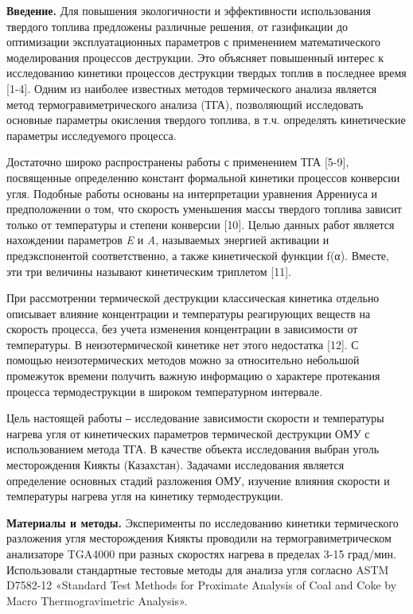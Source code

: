 \begin{multicols}{2}
{\bfseries Введение.} Для повышения экологичности и эффективности
использования твердого топлива предложены различные решения, от
газификации до оптимизации эксплуатационных параметров с применением
математического моделирования процессов деструкции. Это объясняет
повышенный интерес к исследованию кинетики процессов деструкции твердых
топлив в последнее время {[}1-4{]}. Одним из наиболее известных методов
термического анализа является метод термогравиметрического анализа
(ТГА), позволяющий исследовать основные параметры окисления твердого
топлива, в т.ч. определять кинетические параметры исследуемого процесса.

Достаточно широко распространены работы с применением ТГА {[}5-9{]},
посвященные определению констант формальной кинетики процессов конверсии
угля. Подобные работы основаны на интерпретации уравнения Аррениуса и
предположении о том, что скорость уменьшения массы твердого топлива
зависит только от температуры и степени конверсии {[}10{]}. Целью данных
работ является нахождении параметров \emph{E} и \emph{A}, называемых
энергией активации и предэкспонентой соответственно, а также
кинетической функции f(α). Вместе, эти три величины называют
кинетическим триплетом {[}11{]}.

При рассмотрении термической деструкции классическая кинетика отдельно
описывает влияние концентрации и температуры реагирующих веществ на
скорость процесса, без учета изменения концентрации в зависимости от
температуры. В неизотермической кинетике нет этого недостатка {[}12{]}.
С помощью неизотермических методов можно за относительно небольшой
промежуток времени получить важную информацию о характере протекания
процесса термодеструкции в широком температурном интервале.

Цель настоящей работы ‒ исследование зависимости скорости и температуры
нагрева угля от кинетических параметров термической деструкции ОМУ с
использованием метода ТГА. В качестве объекта исследования выбран уголь
месторождения Киякты (Казахстан). Задачами исследования является
определение основных стадий разложения ОМУ, изучение влияния скорости и
температуры нагрева угля на кинетику термодеструкции.

{\bfseries Материалы и методы.} Эксперименты по исследованию кинетики
термического разложения угля месторождения Киякты проводили на
термогравиметрическом анализаторе TGA4000 при разных скоростях нагрева в
пределах 3-15 град/мин. Использовали стандартные тестовые методы для
анализа угля согласно ASTM D7582-12 «Standard Test Methods for Proximate
Analysis of Coal and Coke by Macro Thermogravimetric Analysis».


\end{multicols}
